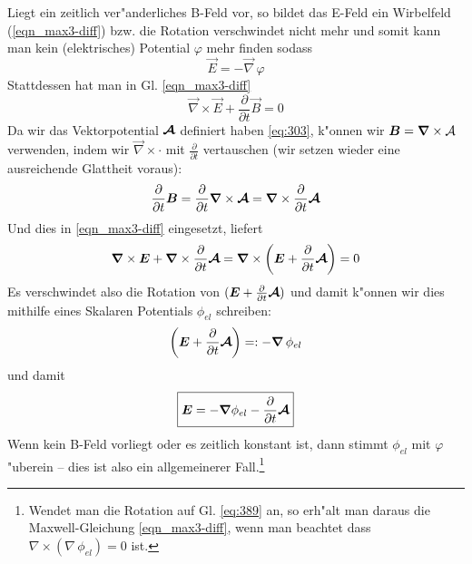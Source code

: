 Liegt ein zeitlich ver"anderliches B-Feld vor, so bildet das E-Feld ein
Wirbelfeld (\eqref{eqn_max3-diff}) bzw. die Rotation verschwindet
nicht mehr und somit kann man kein (elektrisches) Potential
$\varphi$ mehr finden sodass
\begin{equation*}
   \vec E = - \vec \nabla \, \varphi
\end{equation*}
Stattdessen hat man in Gl. \eqref{eqn_max3-diff}
\begin{equation*}
   \label{eq:385}
   \vec\nabla \times \vec E + \frac{\partial }{\partial t}\vec B = 0
\end{equation*}
Da wir das Vektorpotential $\boldsymbol{\mathcal{A}}$ definiert haben
\eqref{eq:303}, k"onnen wir $\boldsymbol{B} = \boldsymbol{\nabla}\times \mathcal{A}$
verwenden, indem wir $\vec\nabla\times \cdot$ mit $\frac{\partial
}{\partial t}$ vertauschen (wir setzen wieder eine ausreichende
Glattheit voraus):
\begin{equation}
   \label{eq:386}
   \frac{\partial }{\partial t}\boldsymbol{B} = \frac{\partial }{\partial t}
   \boldsymbol{\nabla}\times\boldsymbol{\mathcal{A}} = \boldsymbol{\nabla}\times \frac{\partial
   }{\partial t} \boldsymbol{\mathcal{A}}
\end{equation}
Und dies in \eqref{eqn_max3-diff} eingesetzt, liefert
\begin{equation}
   \label{eq:387}
   \boldsymbol{\nabla}\times \boldsymbol{E} + \boldsymbol{\nabla} \times \frac{\partial }{\partial t}{\boldsymbol{\mathcal{A}}} =
   \boldsymbol{\nabla}\times \left (\boldsymbol{E} + \frac{\partial }{\partial t }{\boldsymbol{\mathcal{A}}} \right)= 0
\end{equation}
Es verschwindet also die Rotation von $(\boldsymbol{E} + \frac{\partial
}{\partial t }{\boldsymbol{\mathcal{A}}})$
und damit k"onnen wir dies mithilfe eines Skalaren Potentials
$\phi_{el}$ schreiben:
\begin{equation}
   \label{eq:388}
    \left (\boldsymbol{E} + \frac{\partial }{\partial t}{\boldsymbol{\mathcal{A}}} \right)
    =: - \boldsymbol{\nabla}\, \phi_{el}
\end{equation}
und damit
\begin{equation}
   \label{eq:389}
   \boxed{\boldsymbol{E} = - \boldsymbol{\nabla} \phi_{el} - \frac{\partial }{\partial t}\boldsymbol{\mathcal{A}}}
\end{equation}
Wenn kein B-Feld vorliegt oder es zeitlich konstant ist, dann stimmt
$\phi_{el}$ mit $\varphi$ "uberein -- dies ist also ein allgemeinerer
Fall.\footnote{Wendet man die Rotation auf Gl. \eqref{eq:389} an, so
  erh"alt man daraus die Maxwell-Gleichung \eqref{eqn_max3-diff}, wenn
  man beachtet dass $\nabla \times (\nabla\, \phi_{el}) = 0$ ist.}

